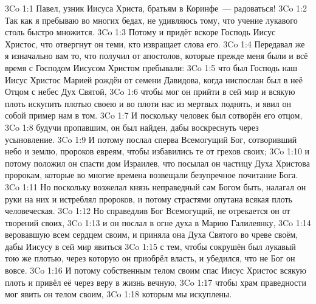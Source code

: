 \vs 3Co 1:1
Павел, узник Иисуса Христа, братьям в Коринфе~--- радоваться!
\vs 3Co 1:2
Так как я пребываю во многих бедах,
не удивляюсь тому, что учение лукавого столь быстро множится.
\vs 3Co 1:3
Потому и придёт вскоре Господь Иисус Христос,
что отвергнут он теми, кто извращает слова его.
\vs 3Co 1:4
Передавал же я изначально вам то,
что получил от апостолов,
которые прежде меня были и всё время с
Господом Иисусом Христом пребывали:
\vs 3Co 1:5
что был Господь наш Иисус Христос Марией рождён
от семени Давидова, когда ниспослан был в неё Отцом
с небес Дух Святой,
\vs 3Co 1:6
чтобы мог он прийти в сей мир и всякую плоть
искупить плотью своею и во плоти нас из мертвых
поднять, и явил он собой пример нам в том.
\vs 3Co 1:7
И поскольку человек был сотворён его отцом,
\vs 3Co 1:8
будучи пропавшим, он был найден,
дабы воскреснуть через усыновление.
\vs 3Co 1:9
И потому послал сперва Всемогущий Бог,
сотворивший небо и землю,
пророков евреям, чтобы избавились те от грехов своих;
\vs 3Co 1:10
и потому положил он спасти дом Израилев,
что посылал он частицу Духа Христова пророкам,
которые во многие времена возвещали
безупречное почитание Бога.
\vs 3Co 1:11
Но поскольку возжелал князь неправедный сам
Богом быть, налагал он руки на них и истреблял пророков,
и потому страстями опутана всякая плоть человеческая.
\vs 3Co 1:12
Но справедлив Бог Всемогущий,
не отрекается он от творений своих,
\vs 3Co 1:13
и он послал в огне духа в Марию Галилеянку,
\vs 3Co 1:14
веровавшую всем сердцем своим, и приняла
она Духа Святого во чреве своём,
дабы Иисусу в сей мир явиться
\vs 3Co 1:15
с тем, чтобы сокрушён был лукавый тою же плотью,
через которую он приобрёл власть,
и убедился, что не Бог он вовсе.
\vs 3Co 1:16
И потому собственным телом своим спас
Иисус Христос всякую плоть и привёл
её через веру в жизнь вечную,
\vs 3Co 1:17
чтобы храм праведности мог явить он телом своим,
\vs 3Co 1:18
которым мы искуплены.

